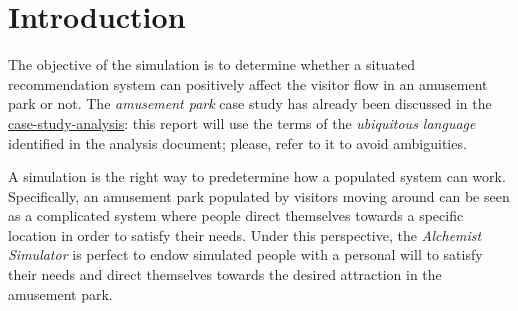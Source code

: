\section{Introduction}

The objective of the simulation is to determine whether a situated recommendation system can positively affect the visitor flow in an amusement park or not. The \textit{amusement park} case study has already been discussed in the \href{https://github.com/ICPS-MicroCity/case-study-analysis/releases/tag/v0.2.1}{case-study-analysis}: this report will use the terms of the \textit{ubiquitous language} identified in the analysis document; please, refer to it to avoid ambiguities.

A simulation is the right way to predetermine how a populated system can work. Specifically, an amusement park populated by visitors moving around can be seen as a complicated system where people direct themselves towards a specific location in order to satisfy their needs. Under this perspective, the \textit{Alchemist Simulator} \cite{Pianini_2013} is perfect to endow simulated people with a personal will to satisfy their needs and direct themselves towards the desired attraction in the amusement park.

